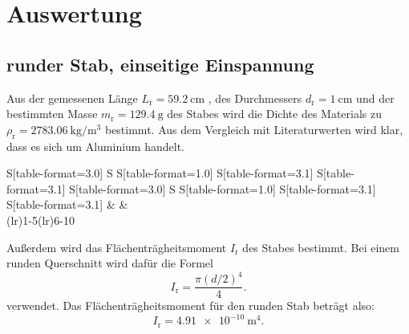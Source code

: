\section{Auswertung}
\label{sec:Auswertung}

\subsection{runder Stab, einseitige Einspannung}

Aus der gemessenen Länge $L_{\text{r}}= \qty{59,2}{\centi\meter}$ , des Durchmessers $d_{\text{r}}= \qty{1}{\centi\meter}$ und der bestimmten Masse $m_{\text{r}}= \qty{129,4}{\gram}$
 des Stabes wird die Dichte des Materials zu $\rho_{\text{r}} = \qty{2783,06}{\kilo\gram\per\cubic\meter}$ bestimmt.
Aus dem Vergleich mit Literaturwerten \cite{Dichte} wird klar, dass es sich um Aluminium handelt.
\begin{table}
  \centering
  \caption{Maße des runden und des eckigen Stabes}
  \begin{tabular}{S[table-format=3.0]
      S
      S[table-format=1.0]
      S[table-format=3.1]
      S[table-format=3.1]
      S[table-format=3.0]
      S
      S[table-format=1.0]
      S[table-format=3.1]
      S[table-format=3.1]}
    \toprule
    &  &  \\
    \cmidrule(lr){1-5}\cmidrule(lr){6-10}
    
  \end{tabular}
\end{table}


Außerdem wird das Flächenträgheitsmoment $I_{\text{r}}$  des Stabes bestimmt. Bei einem runden Querschnitt wird dafür die Formel \cite{flaeche}
\begin{equation*}
  I_{\text{r}} = \frac{\pi (d/2)^4}{4}.
\end{equation*} verwendet.
Das Flächenträgheitsmoment für den runden Stab beträgt also: 
\begin{equation*}
  I_{\text{r}} = \qty{4,91e-10}{\meter\tothe{4}}.
\end{equation*}

